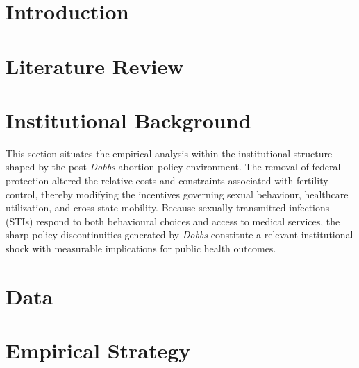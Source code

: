 \documentclass{article}
\begin{document}
\newpage
\tableofcontents
\newpage

\listoffigures

\listoftables
\newpage



\section{Introduction}

% 

\section{Literature Review}\label{sec:literature}

% 


\section{Institutional Background}

This section situates the empirical analysis within the institutional structure shaped by the post-\textit{Dobbs} abortion policy environment. The removal of federal protection altered the relative costs and constraints associated with fertility control, thereby modifying the incentives governing sexual behaviour, healthcare utilization, and cross-state mobility. Because sexually transmitted infections (STIs) respond to both behavioural choices and access to medical services, the sharp policy discontinuities generated by \textit{Dobbs} constitute a relevant institutional shock with measurable implications for public health outcomes. 

% 
\section{Data}
\label{sec:data}




\section{Empirical Strategy}\label{sec:strategy}
\end{document}

